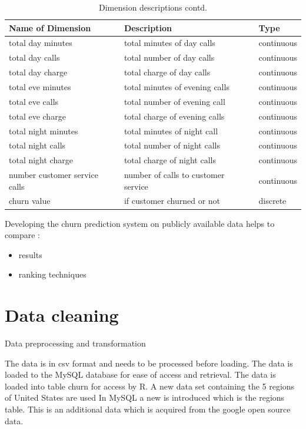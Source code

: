 \begin{table}[h]
	\centering
	\caption{Dimension descriptions contd.}
	\label{var-2}
	\begin{tabular}{lll}
		\hline
		Name of Dimension & Description            & Type                \\
		\hline
		total day minutes &  total minutes of day calls  &  continuous   \\
		total day calls & total number of day calls &  continuous   \\
		total day charge & total charge of day calls &  continuous   \\
		total eve minutes & total minutes of evening calls &  continuous   \\
		total eve calls & total number of evening call  &  continuous   \\
		total eve charge & total charge of evening calls  &  continuous   \\
		total night minutes & total minutes of night call &  continuous   \\
		total night calls & total number of night calls &  continuous   \\
		total night charge & total charge of night calls  &  continuous   \\
		number customer service calls & number of calls to customer service &  continuous   \\
		churn value & if customer churned or not & discrete \\
		\hline
	\end{tabular}
\end{table}

Developing the churn prediction system on publicly available data helps to compare  :
\begin{itemize}
	\item results
	\item ranking techniques
\end{itemize}


\section{Data cleaning}

Data preprocessing and transformation

The data is in csv format and needs to be processed before loading. The data is loaded to the MySQL database for ease of access and retrieval. The data is loaded into table churn for access by R.
A new data set containing the 5 regions of United States are used   In MySQL a new is introduced which is the regions table. This is an additional data which is acquired from the google open source data. 

